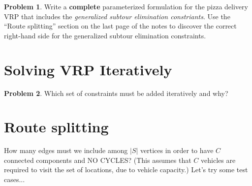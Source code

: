 \documentclass[11pt]{article}
\theoremstyle{definition}
\newtheorem{problem}{Problem}
\newcommand{\answerbox}[3]{%
  \fbox{%
    \begin{minipage}[#1]{#2}
      \hfill\vspace{#3}
    \end{minipage}
  }
}
\newcommand{\answerboxfull}[2]{%
  \answerbox{#1}{6.38in}{#2} 
}
\begin{document}
\begin{problem}
Write a \textbf{complete} parameterized formulation for the pizza delivery VRP that includes the \emph{generalized subtour elimination constriants}.  Use the ``Route splitting'' section on the last page of the notes to discover the correct right-hand side for the generalized subtour elimination constraints.\\
\answerboxfull{c}{10cm}
\end{problem}

\section{Solving VRP Iteratively}  
\begin{problem}Which set of constraints must be added iteratively and why?

\answerboxfull{c}{2cm}
\end{problem}

\section{Route splitting}

How many edges must we include among $|S|$ vertices in order to have $C$ connected components and NO CYCLES?  (This assumes that $C$ vehicles are required to visit the set of locations, due to vehicle capacity.)  Let's try some test cases...
\end{document}

